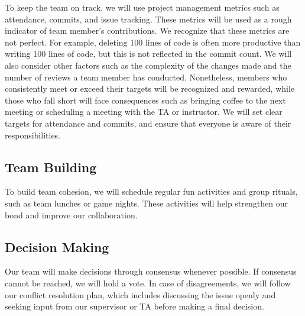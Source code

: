 \documentclass{article}
\begin{document}
To keep the team on track, we will use project management metrics such as attendance, commits, and issue tracking. These metrics will be used as a rough indicator of team member's contributions. We recognize that these metrics are not perfect. For example, deleting 100 lines of code is often more productive than writing 100 lines of code, but this is not reflected in the commit count. We will also consider other factors such as the complexity of the changes made and the number of reviews a team member has conducted. Nonetheless, members who consistently meet or exceed their targets will be recognized and rewarded, while those who fall short will face consequences such as bringing coffee to the next meeting or scheduling a meeting with the TA or instructor. We will set clear targets for attendance and commits, and ensure that everyone is aware of their responsibilities.

\subsection*{Team Building}

To build team cohesion, we will schedule regular fun activities and group rituals, such as team lunches or game nights. These activities will help strengthen our bond and improve our collaboration.

\subsection*{Decision Making}

Our team will make decisions through consensus whenever possible. If consensus cannot be reached, we will hold a vote. In case of disagreements, we will follow our conflict resolution plan, which includes discussing the issue openly and seeking input from our supervisor or TA before making a final decision.
\end{document}
